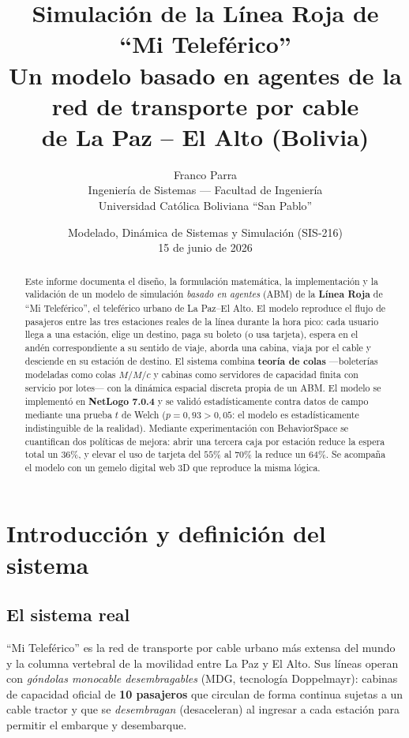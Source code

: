 \documentclass[11pt,a4paper]{article}
\title{\textbf{Simulación de la Línea Roja de ``Mi Teleférico''}\\[4pt]
\large Un modelo basado en agentes de la red de transporte por cable\\
de La Paz -- El Alto (Bolivia)}
\author{Franco Parra\\
\small Ingeniería de Sistemas --- Facultad de Ingeniería\\
\small Universidad Católica Boliviana ``San Pablo''}
\date{Modelado, Dinámica de Sistemas y Simulación (SIS-216) \\ 15 de junio de 2026}
\begin{document}
\maketitle

\begin{abstract}
\noindent
Este informe documenta el diseño, la formulación matemática, la implementación y la
validación de un modelo de simulación \emph{basado en agentes} (ABM) de la
\textbf{Línea Roja} de ``Mi Teleférico'', el teleférico urbano de La Paz--El Alto.
El modelo reproduce el flujo de pasajeros entre las tres estaciones reales de la
línea durante la hora pico: cada usuario llega a una estación, elige un destino,
paga su boleto (o usa tarjeta), espera en el andén correspondiente a su sentido de
viaje, aborda una cabina, viaja por el cable y desciende en su estación de destino.
El sistema combina \textbf{teoría de colas} ---boleterías modeladas como colas
$M/M/c$ y cabinas como servidores de capacidad finita con servicio por lotes--- con
la dinámica espacial discreta propia de un ABM. El modelo se implementó en
\textbf{NetLogo 7.0.4} y se validó estadísticamente contra datos de campo mediante
una prueba $t$ de Welch ($p = 0{,}93 > 0{,}05$: el modelo es estadísticamente
indistinguible de la realidad). Mediante experimentación con BehaviorSpace se
cuantifican dos políticas de mejora: abrir una tercera caja por estación reduce la
espera total un $36\%$, y elevar el uso de tarjeta del $55\%$ al $70\%$ la reduce un
$64\%$. Se acompaña el modelo con un gemelo digital web 3D que reproduce la misma
lógica.
\end{abstract}

\tableofcontents
\newpage

\section{Introducción y definición del sistema}

\subsection{El sistema real}
``Mi Teleférico'' es la red de transporte por cable urbano más extensa del mundo y
la columna vertebral de la movilidad entre La Paz y El Alto. Sus líneas operan con
\emph{góndolas monocable desembragables} (MDG, tecnología Doppelmayr): cabinas de
capacidad oficial de \textbf{10 pasajeros} que circulan de forma continua sujetas a
un cable tractor y que se \emph{desembragan} (desaceleran) al ingresar a cada
estación para permitir el embarque y desembarque.
\end{document}
